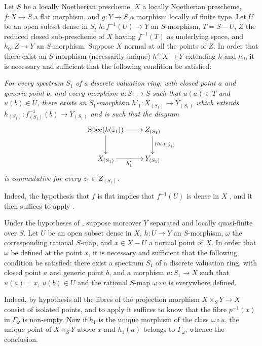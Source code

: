 \begin{corollary}[20.4.9]
\label{IV.20.4.9}
Let $S$ be a locally Noetherian prescheme, $X$ a locally Noetherian prescheme, $f:X\to S$ a flat morphism, and $g:Y\to S$ a morphism locally of finite type.
Let $U$ be an open subset dense in $S$, $h:f^{-1}(U)\to Y$ an $S$-morphism, $T=S-U$, $Z$ the reduced closed sub-prescheme of $X$ having $f^{-1}(T)$ as underlying space, and $h_0:Z\to Y$ an $S$-morphism.
Suppose $X$ normal at all the points of $Z$.
In order that there exist an $S$-morphism (necessarily unique) $h':X\to Y$ extending $h$ and $h_0$, it is necessary and sufficient that the following condition be satisfied:

\emph{For every spectrum $S_1$ of a discrete valuation ring, with closed point $a$ and generic point $b$, and every morphism $u:S_1\to S$ such that $u(a)\in T$ and $u(b)\in U$, there exists an $S_1$-morphism $h'_1:X_{(S_1)}\to Y_{(S_1)}$ which extends $h_{(S_1)}:f_{(S_1)}^{-1}(b)\to Y_{(S_1)}$ and is such that the diagram}
\[
  \xymatrix{
  \Spec(k(z_1)) \ar[r] \ar[d] & Z_{(S_1)} \ar[d]^{(h_0)_{(S_1)}} \\
  X_{(S_1)} \ar[r]_{h'_1} & Y_{(S_1)}
  }
\]
\emph{is commutative for every $z_1\in Z_{(S_1)}$.}

Indeed, the hypothesis that $f$ is flat implies that $f^{-1}(U)$ is dense in $X$ , and it then suffices to apply .
\end{corollary}

\begin{corollary}[20.4.10]
\label{IV.20.4.10}
Under the hypotheses of , suppose moreover $Y$ separated and locally quasi-finite over $S$.
Let $U$ be an open subset dense in $X$, $h:U\to Y$ an $S$-morphism, $\omega$ the corresponding rational $S$-map, and $x\in X-U$ a normal point of $X$.
In order that $\omega$ be defined at the point $x$, it is necessary and sufficient that the following condition be satisfied: there exist a spectrum $S_1$ of a discrete valuation ring, with closed point $a$ and generic point $b$, and a morphism $u:S_1\to X$
such that $u(a)=x$, $u(b)\in U$ and the rational $S$-map $\omega\circ u$ is everywhere defined.

Indeed, by hypothesis all the fibres of the projection morphism $X\times_S Y\to X$ consist of isolated points, and to apply  it suffices to know that the fibre $p^{-1}(x)$ in $\Gamma_\omega$ is non-empty.
Now if $h_1$ is the unique morphism of the class $\omega\circ u$, the unique point of $X\times_S Y$ above $x$ and $h_1(a)$ belongs to $\Gamma_\omega$, whence the conclusion.
\end{corollary}

